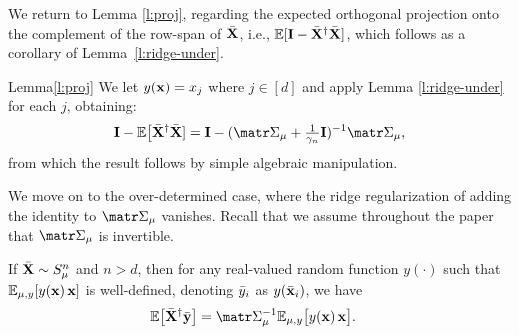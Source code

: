 \documentclass[../../thesis.tex]{subfiles}
\begin{document}
We return to Lemma \ref{l:proj}, regarding the expected orthogonal
projection onto the complement of the row-span of ${\bar{\mathbf X}}$, i.e.,
$\mathbb E[\mathbf I-{\bar{\mathbf X}}^\dagger{\bar{\mathbf X}}]$, which follows as a corollary of Lemma~\ref{l:ridge-under}.
\begin{proofof}{Lemma}{\ref{l:proj}}
  We let $y(\mathbf x)=x_j$ where $j\in[d]$ and apply Lemma
  \ref{l:ridge-under} for each $j$, obtaining:
  \begin{align*}
    \I - \E\big[\Xb^\dagger\Xb] = \I -
    (\Sigmab_\mu+\tfrac1{\gamma_n}\I)^{-1}\Sigmab_\mu,
  \end{align*}
  from which the result follows by simple algebraic manipulation.
\end{proofof}

We move on to the over-determined case, where the ridge regularization
of adding the identity to $\Sigmab_\mu$ vanishes. Recall that we
assume throughout the paper that $\Sigmab_\mu$ is invertible.
\begin{lemma}\label{l:ridge-over}
  If ${\bar{\mathbf X}}\sim S_\mu^n$ and $n>d$, then for any real-valued random function $y(\cdot)$
  such that $\mathbb E_{\mu,y}[y(\mathbf x)\,\mathbf x]$ is well-defined,
  denoting ${\bar y}_i$ as $y(\bar{\mathbf x}_i)$, we have
  \begin{align*}
    \E\big[\Xb^\dagger \ybb\big]
     & =\Sigmab_\mu^{-1}\E_{\mu,y}\big[y(\x)\,\x\big].
  \end{align*}
\end{lemma}
\end{document}
